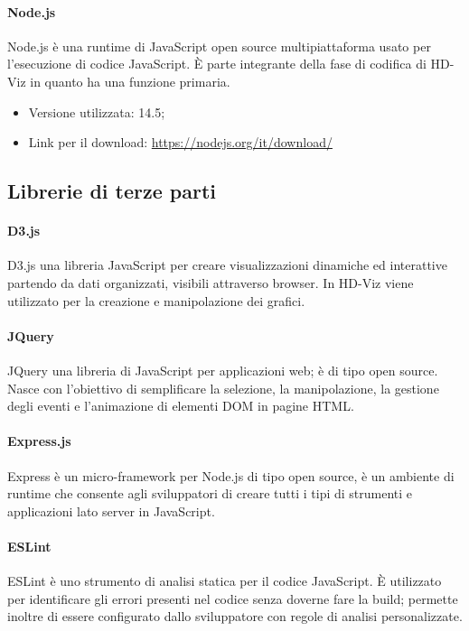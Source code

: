 \documentclass[../manuale_sviluppatore.tex]{subfiles}
\begin{document}
\paragraph{Node.js}
Node.js è una runtime di JavaScript open source multipiattaforma usato per l’esecuzione di codice JavaScript.  
È parte integrante della fase di codifica di HD-Viz in quanto ha una funzione primaria.\\
\begin{itemize}
    \item Versione utilizzata: 14.5;
    \item Link per il download: \url{https://nodejs.org/it/download/}
\end{itemize}



\subsection{Librerie di terze parti}

\paragraph{D3.js}
D3.js una libreria JavaScript per creare visualizzazioni dinamiche ed interattive partendo da dati organizzati, visibili attraverso browser. 
In HD-Viz viene utilizzato per la creazione e manipolazione dei grafici.

\paragraph{JQuery}
JQuery una libreria di JavaScript per applicazioni web; è di tipo open source. Nasce con l'obiettivo di semplificare la selezione, la manipolazione, la gestione degli eventi e l'animazione di elementi DOM in pagine HTML.

\paragraph{Express.js}
Express è un micro-framework per Node.js di tipo open source, è un ambiente di runtime che consente agli sviluppatori di creare tutti i tipi di strumenti e applicazioni lato server in JavaScript.

\paragraph{ESLint}
ESLint è uno strumento di analisi statica per il codice JavaScript. È utilizzato per identificare gli errori presenti nel codice senza doverne fare la build; 
permette inoltre di essere configurato dallo sviluppatore con regole di analisi personalizzate.
\end{document}
